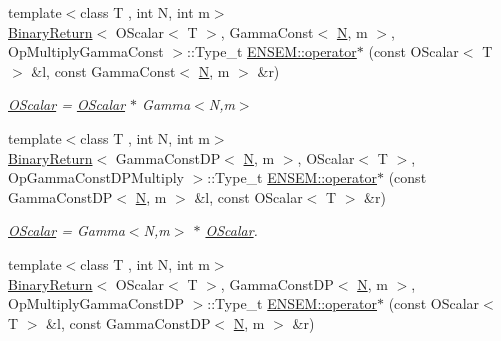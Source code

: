 \begin{DoxyCompactItemize}
{\footnotesize template$<$class T , int N, int m$>$ }\\\mbox{\hyperlink{structBinaryReturn}{Binary\+Return}}$<$ O\+Scalar$<$ T $>$, Gamma\+Const$<$ \mbox{\hyperlink{adat__devel_2lib_2hadron_2operator__name__util_8cc_a7722c8ecbb62d99aee7ce68b1752f337}{N}}, m $>$, Op\+Multiply\+Gamma\+Const $>$\+::Type\+\_\+t \mbox{\hyperlink{group__obsscalar_ga1a9ed6642b9c94843e7a8c143c2f0236}{E\+N\+S\+E\+M\+::operator$\ast$}} (const O\+Scalar$<$ T $>$ \&l, const Gamma\+Const$<$ \mbox{\hyperlink{adat__devel_2lib_2hadron_2operator__name__util_8cc_a7722c8ecbb62d99aee7ce68b1752f337}{N}}, m $>$ \&r)
\begin{DoxyCompactList}\small\item\em \mbox{\hyperlink{classENSEM_1_1OScalar}{O\+Scalar}} = \mbox{\hyperlink{classENSEM_1_1OScalar}{O\+Scalar}} $\ast$ Gamma$<$\+N,m$>$ \end{DoxyCompactList}\item 
{\footnotesize template$<$class T , int N, int m$>$ }\\\mbox{\hyperlink{structBinaryReturn}{Binary\+Return}}$<$ Gamma\+Const\+DP$<$ \mbox{\hyperlink{adat__devel_2lib_2hadron_2operator__name__util_8cc_a7722c8ecbb62d99aee7ce68b1752f337}{N}}, m $>$, O\+Scalar$<$ T $>$, Op\+Gamma\+Const\+D\+P\+Multiply $>$\+::Type\+\_\+t \mbox{\hyperlink{group__obsscalar_gadcaef62da25fe9015ccfbdc330caee50}{E\+N\+S\+E\+M\+::operator$\ast$}} (const Gamma\+Const\+DP$<$ \mbox{\hyperlink{adat__devel_2lib_2hadron_2operator__name__util_8cc_a7722c8ecbb62d99aee7ce68b1752f337}{N}}, m $>$ \&l, const O\+Scalar$<$ T $>$ \&r)
\begin{DoxyCompactList}\small\item\em \mbox{\hyperlink{classENSEM_1_1OScalar}{O\+Scalar}} = Gamma$<$\+N,m$>$ $\ast$ \mbox{\hyperlink{classENSEM_1_1OScalar}{O\+Scalar}}. \end{DoxyCompactList}\item 
{\footnotesize template$<$class T , int N, int m$>$ }\\\mbox{\hyperlink{structBinaryReturn}{Binary\+Return}}$<$ O\+Scalar$<$ T $>$, Gamma\+Const\+DP$<$ \mbox{\hyperlink{adat__devel_2lib_2hadron_2operator__name__util_8cc_a7722c8ecbb62d99aee7ce68b1752f337}{N}}, m $>$, Op\+Multiply\+Gamma\+Const\+DP $>$\+::Type\+\_\+t \mbox{\hyperlink{group__obsscalar_ga3a908302b6f4903874da2282ce03fdf7}{E\+N\+S\+E\+M\+::operator$\ast$}} (const O\+Scalar$<$ T $>$ \&l, const Gamma\+Const\+DP$<$ \mbox{\hyperlink{adat__devel_2lib_2hadron_2operator__name__util_8cc_a7722c8ecbb62d99aee7ce68b1752f337}{N}}, m $>$ \&r)

\end{DoxyCompactItemize}
